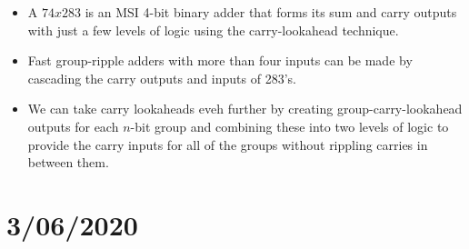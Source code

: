 \documentclass[10pt,a4paper]{article}
\begin{document}
\begin{itemize}
\item A $74x283$ is an MSI 4-bit binary adder that forms its sum and carry outputs with just a few levels of logic using the carry-lookahead technique. 
\item Fast group-ripple adders with more than four inputs can be made by cascading the carry outputs and inputs of 283's.
\item We can take carry lookaheads eveh further by creating group-carry-lookahead outputs for each $n$-bit group and combining these into two levels of logic to provide the carry inputs for all of the groups without rippling carries in between them. 
\end{itemize}
\pagebreak
\section{3/06/2020}
\end{document}
